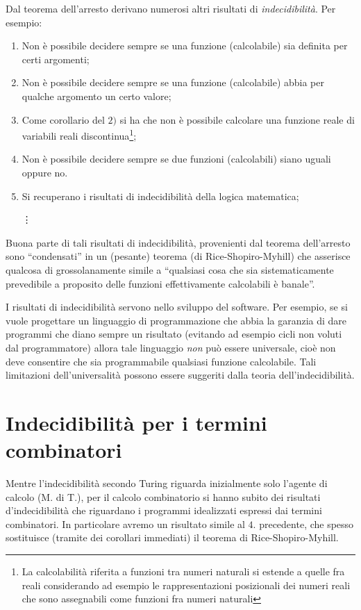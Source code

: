 \documentclass{book}
\begin{document}
Dal teorema dell'arresto derivano numerosi altri risultati di 
\emph{indecidibilit\`a}. Per esempio:
\begin{enumerate}
\item Non \`e possibile decidere sempre se una funzione (calcolabile) sia
  definita per certi argomenti; 
\item Non \`e possibile decidere sempre se una funzione (calcolabile) abbia per
  qualche argomento un certo valore;
\item Come corollario del $2)$ si ha che non \`e possibile calcolare una 
  funzione reale di variabili reali discontinua\footnote{La calcolabilit\`a
  riferita a funzioni tra numeri naturali si estende a quelle fra reali 
considerando ad esempio le rappresentazioni posizionali dei numeri reali che
sono assegnabili come funzioni fra numeri naturali};
\item Non \`e possibile decidere sempre se due funzioni (calcolabili) siano
  uguali oppure no.
\item Si recuperano i risultati di indecidibilit\`a della logica matematica;
\item[\vdots] 
\end{enumerate}
Buona parte di tali risultati di indecidibilit\`a, provenienti dal teorema 
dell'arresto sono ``condensati'' in un (pesante) teorema 
(di Rice-Shopiro-Myhill) che asserisce qualcosa di grossolanamente simile a
``qualsiasi cosa che sia sistematicamente prevedibile a proposito delle
funzioni effettivamente calcolabili \`e banale''.

I risultati di indecidibilit\`a servono nello sviluppo del software. Per 
esempio, se si vuole progettare un linguaggio di programmazione che abbia la
garanzia di dare programmi che diano sempre un risultato (evitando ad esempio
cicli non voluti dal programmatore) allora tale linguaggio \emph{non} pu\`o 
essere universale, cio\`e non deve consentire che sia programmabile qualsiasi
funzione calcolabile. Tali limitazioni dell'universalit\`a possono essere 
suggeriti dalla teoria dell'indecidibilit\`a.

\section{Indecidibilit\`a per i termini combinatori}
Mentre l'indecidibilit\`a secondo Turing riguarda inizialmente solo l'agente di
calcolo (M. di T.), per il calcolo combinatorio si hanno subito dei risultati
d'indecidibilit\`a che riguardano i programmi idealizzati espressi dai termini
combinatori. In particolare avremo un risultato simile al $4.$ precedente, che
spesso sostituisce (tramite dei corollari immediati) il teorema di 
Rice-Shopiro-Myhill.
\end{document}
